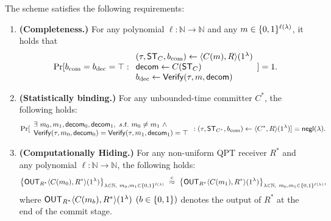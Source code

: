 \begin{definition}
The scheme satisfies the following requirements:
\begin{enumerate}
\item
{\bf (Completeness.)} For any polynomial $\ell:\mathbb{N} \rightarrow \mathbb{N}$ and any $m \in \{0,1\}^{\ell(\lambda)}$, it holds that
\begin{equation*}
\Pr[b_{\mathrm{com}}=b_{\mathrm{dec}}=\top : 
\begin{array}{l}
(\tau, \mathsf{ST}_{C}, b_{\mathrm{com}}) \gets \langle C(m),R \rangle(1^\lambda) \\
\mathsf{decom} \gets C(\mathsf{ST}_C)\\
b_{\mathrm{dec}}\gets \mathsf{Verify}(\tau,m,\mathsf{decom})
\end{array}
] = 1.
\end{equation*}

\item
{\bf (Statistically binding.)} For any unbounded-time committer $C^*$, the following holds: 
\begin{align*}
    \Pr[
    \begin{array}{l}
    \exists~m_0,m_1,\mathsf{decom}_0,\mathsf{decom}_1,~s.t.~m_0\neq m_1 ~\land\\
     \mathsf{Verify}(\tau,m_0,\mathsf{decom}_0)=\mathsf{Verify}(\tau,m_1,\mathsf{decom}_1)=\top
    \end{array}
    :(\tau,\mathsf{ST}_{C^*},b_{\mathrm{com}}) \gets \langle C^*, R \rangle(1^\lambda)]=\mathsf{negl}(\lambda).
\end{align*}

\item
{\bf (Computationally Hiding.)} For any non-uniform QPT receiver $R^*$ and any polynomial $\ell : \mathbb{N} \rightarrow \mathbb{N}$, the following holds:
$$\big\{ \mathsf{OUT}_{R^*}\langle C(m_0),R^* \rangle(1^\lambda)\big\}_{\lambda \in \mathbb{N}, ~m_0, m_1 \in \{0,1\}^{\ell(\lambda)}} ~\stackrel{\text{c}}{\approx}~ \big\{ \mathsf{OUT}_{R^*}\langle C(m_1),R^* \rangle(1^\lambda)\big\}_{\lambda \in \mathbb{N}, ~m_0, m_1 \in \{0,1\}^{\ell(\lambda)}},$$
where $\mathsf{OUT}_{R^*}\langle C(m_b),R^* \rangle(1^\lambda)$ $(b \in \{0,1\})$ denotes the output of $R^*$ at the end of the commit stage. 
\end{enumerate}
\end{definition}



